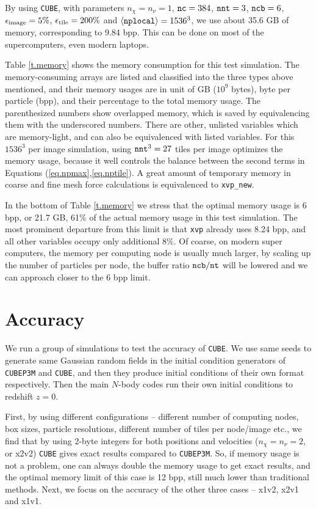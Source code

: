 \documentclass[10pt,twocolumn,preprint]{emulateapj}
\begin{document}
By using {\tt CUBE}, with parameters $n_\chi=n_\nu=1$, ${\tt nc}=384$, ${\tt nnt}=3$, ${\tt ncb}=6$, $\epsilon_{\rm image}=5\%$, $\epsilon_{\rm tile}=200\%$ and $\left\langle {\tt nplocal} \right\rangle=1536^3$, we use about 35.6 GB of memory, corresponding to 9.84 bpp. This can be done on most of the supercomputers, even modern laptops.

Table \ref{t.memory} shows the memory consumption for this test simulation. The memory-consuming arrays are listed and classified into the three types above mentioned, and their memory usages are in unit of GB ($10^9$ bytes), byte per particle (bpp), and their percentage to the total memory usage. The parenthesized numbers show overlapped memory, which is saved by equivalencing them with the underscored numbers. There are other, unlisted variables which are memory-light, and can also be equivalenced with listed variables. For this $1536^3$ per image simulation, using ${\tt nnt}^3=27$ tiles per image optimizes the memory usage, because it well controls the balance between the second terms in Equations (\ref{eq.npmax},\ref{eq.nptile}). A great amount of temporary memory in coarse and fine mesh force calculations is equivalenced to {\tt xvp\_new}.

In the bottom of Table \ref{t.memory} we stress that the optimal memory usage is 6 bpp, or 21.7 GB, 61\% of the actual memory usage in this test simulation. The most prominent departure from this limit is that {\tt xvp} already uses 8.24 bpp, and all other variables occupy only additional 8\%. Of coarse, on modern super computers, the memory per computing node is usually much larger, by scaling up the number of particles per node, the buffer ratio ${\tt ncb}/{\tt nt}$ will be lowered and we can approach closer to the 6 bpp limit.

\section{Accuracy}\label{s.results}
We run a group of simulations to test the accuracy of {\tt CUBE}. We use same seeds to generate same Gaussian random fields in the initial condition generators of {\tt CUBEP3M} and {\tt CUBE}, and then they produce initial conditions of their own format respectively. Then the main $N$-body codes run their own initial conditions to redshift $z=0$.

First, by using different configurations -- different number of computing nodes, box sizes, particle resolutions, different number of tiles per node/image etc., we find that by using 2-byte integers for both positions and velocities ($n_\chi=n_\nu=2$, or x2v2) {\tt CUBE} gives exact results compared to {\tt CUBEP3M}. So, if memory usage is not a problem, one can always double the memory usage to get exact results, and the optimal memory limit of this case is 12 bpp, still much lower than traditional methods. Next, we focus on the accuracy of the other three cases -- x1v2, x2v1 and x1v1.
\end{document}
